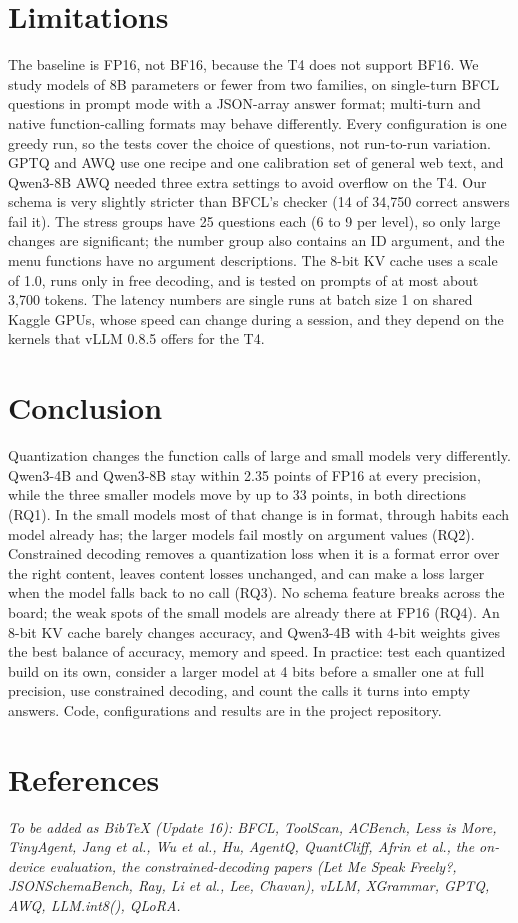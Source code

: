 \documentclass[conference]{IEEEtran}
\begin{document}
\section{Limitations}
The baseline is FP16, not BF16, because the T4 does not support BF16. We study models of 8B parameters or fewer from
two families, on single-turn BFCL questions in prompt mode with a JSON-array answer format; multi-turn and
native function-calling formats may behave differently. Every configuration is one greedy run, so the tests cover the
choice of questions, not run-to-run variation. GPTQ and AWQ use one recipe and one calibration set of general web
text, and Qwen3-8B AWQ needed three extra settings to avoid overflow on the T4. Our schema is very slightly stricter
than BFCL's checker (14 of 34,750 correct answers fail it). The stress groups have 25 questions each (6 to 9 per
level), so only large changes are significant; the number group also contains an ID argument, and the menu functions
have no argument descriptions. The 8-bit KV cache uses a scale of 1.0, runs only in free decoding, and is tested on
prompts of at most about 3,700 tokens. The latency numbers are single runs at batch size 1 on shared Kaggle GPUs,
whose speed can change during a session, and they depend on the kernels that vLLM 0.8.5 offers for the T4.

\section{Conclusion}
Quantization changes the function calls of large and small models very differently. Qwen3-4B and Qwen3-8B stay
within 2.35 points of FP16 at every precision, while the three smaller models move by up to 33 points, in both
directions (RQ1). In the small models most of that change is in format, through habits each model already has; the
larger models fail mostly on argument values (RQ2). Constrained decoding removes a quantization loss when it is a
format error over the right content, leaves content losses unchanged, and can make a loss larger when the model
falls back to no call (RQ3). No schema feature breaks across the board; the weak spots of the small models are
already there at FP16 (RQ4). An 8-bit KV cache barely changes accuracy, and Qwen3-4B with 4-bit weights gives the
best balance of accuracy, memory and speed. In practice: test each quantized build on its own, consider a larger model
at 4 bits before a smaller one at full precision, use constrained decoding, and count the calls it turns into empty
answers. Code, configurations and results are in the project repository.

\section*{References}
\textit{To be added as BibTeX (Update 16): BFCL, ToolScan, ACBench, Less is More, TinyAgent, Jang et al.,
Wu et al., Hu, AgentQ, QuantCliff, Afrin et al., the on-device evaluation, the constrained-decoding papers
(Let Me Speak Freely?, JSONSchemaBench, Ray, Li et al., Lee, Chavan), vLLM, XGrammar, GPTQ, AWQ, LLM.int8(), QLoRA.}
\end{document}
